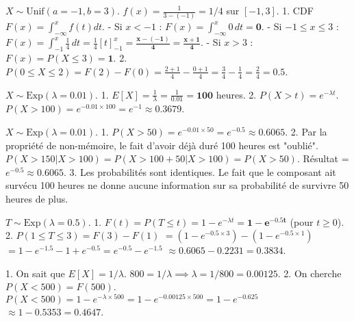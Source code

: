 \begin{correctionbox}
$X \sim \text{Unif}(a=-1, b=3)$. $f(x) = \frac{1}{3 - (-1)} = 1/4$ sur $[-1, 3]$.
1.  CDF $F(x) = \int_{-\infty}^x f(t) dt$.
    - Si $x < -1$ : $F(x) = \int_{-\infty}^x 0 \, dt = \mathbf{0}$.
    - Si $-1 \le x \le 3$ : $F(x) = \int_{-1}^x \frac{1}{4} \, dt = \frac{1}{4}[t]_{-1}^x = \mathbf{\frac{x - (-1)}{4} = \frac{x+1}{4}}$.
    - Si $x > 3$ : $F(x) = P(X \le 3) = \mathbf{1}$.
2.  $P(0 \le X \le 2) = F(2) - F(0) = \frac{2+1}{4} - \frac{0+1}{4} = \frac{3}{4} - \frac{1}{4} = \frac{2}{4} = \mathbf{0.5}$.
\end{correctionbox}


\begin{correctionbox}
$X \sim \text{Exp}(\lambda = 0.01)$.
1.  $E[X] = \frac{1}{\lambda} = \frac{1}{0.01} = \mathbf{100}$ heures.
2.  $P(X > t) = e^{-\lambda t}$.
    $P(X > 100) = e^{-0.01 \times 100} = e^{-1} \approx \mathbf{0.3679}$.
\end{correctionbox}

\begin{correctionbox}
$X \sim \text{Exp}(\lambda = 0.01)$.
1.  $P(X > 50) = e^{-0.01 \times 50} = e^{-0.5} \approx \mathbf{0.6065}$.
2.  Par la propriété de non-mémoire, le fait d'avoir déjà duré 100 heures est "oublié".
    $P(X > 150 | X > 100) = P(X > 100 + 50 | X > 100) = P(X > 50)$.
    Résultat = $e^{-0.5} \approx \mathbf{0.6065}$.
3.  Les probabilités sont identiques. Le fait que le composant ait survécu 100 heures ne donne aucune information sur sa probabilité de survivre 50 heures de plus.
\end{correctionbox}

\begin{correctionbox}
$T \sim \text{Exp}(\lambda=0.5)$.
1.  $F(t) = P(T \le t) = 1 - e^{-\lambda t} = \mathbf{1 - e^{-0.5 t}}$ (pour $t \ge 0$).
2.  $P(1 \le T \le 3) = F(3) - F(1)$
    $= (1 - e^{-0.5 \times 3}) - (1 - e^{-0.5 \times 1})$
    $= 1 - e^{-1.5} - 1 + e^{-0.5} = e^{-0.5} - e^{-1.5}$
    $\approx 0.6065 - 0.2231 = \mathbf{0.3834}$.
\end{correctionbox}

\begin{correctionbox}
1.  On sait que $E[X] = 1/\lambda$.
    $800 = 1/\lambda \implies \lambda = 1/800 = \mathbf{0.00125}$.
2.  On cherche $P(X < 500) = F(500)$.
    $P(X < 500) = 1 - e^{-\lambda \times 500} = 1 - e^{-0.00125 \times 500} = 1 - e^{-0.625}$
    $\approx 1 - 0.5353 = \mathbf{0.4647}$.
\end{correctionbox}

